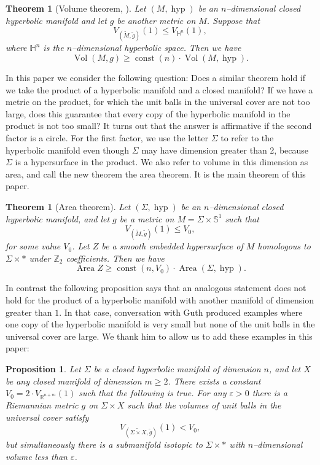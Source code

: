 \documentclass[12pt]{amsart}
\makeatletter
\newtheorem*{rep@theorem}{{Lemma} \ref##}
\newtheorem{thm}[dfn]{Theorem}
    {\newenvironment{rep{thm}}[1]{ } \begin{rep@theorem}} \end{rep@theorem}}
\newtheorem{prop}[dfn]{Proposition}
	{\newenvironment{rep{prop}}[1]{ } \begin{rep@theorem}} \end{rep@theorem}}
\numberwithin{equation}{section}
\makeatother
\begin{document}
\begin{thm}[{Volume theorem, \cite{Guth11}}]\label{thm-vol}
 Let $(M, \operatorname{hyp})$ be an $n$--dimensional closed hyperbolic manifold and let $g$ be another metric on $M$. Suppose that
\[V_{(\widetilde{M}, \widetilde{g})}(1) \leq V_{\mathbb{H}^n}(1),\]
where $\mathbb{H}^n$ is the $n$--dimensional hyperbolic
 space.  Then we have
\[\operatorname{Vol}(M, g) \geq \operatorname{const}(n) \cdot \operatorname{Vol}(M, \operatorname{hyp}).\]
\end{thm}

In this paper we consider the following question: Does a similar theorem
hold if we take the product of a hyperbolic manifold and a closed
manifold? If we have a metric on the product, for
which the unit balls in the universal cover are not too large, does this guarantee that every
copy of the hyperbolic manifold in the product is not too small? It turns out that the answer is affirmative if the second factor is a circle.  For the first factor, we use the letter $\Sigma$ to refer
to the hyperbolic manifold even though $\Sigma$ may have dimension greater than 2, because $\Sigma$ is a hypersurface in the product.  We also refer to volume in this dimension as area, and call
the new theorem the area theorem.  It is the main theorem of this paper.

\begin{thm}[Area theorem]\label{thm-homology}
  Let $(\Sigma, \operatorname{hyp})$ be an $n$--dimensional closed hyperbolic manifold, and let $g$ be a metric on $M = \Sigma \times \mathbb{S}^1$ such that 
\[V_{(\widetilde{M}, \widetilde{g})}(1) \leq V_0,\]
for some value $V_0$.  Let $Z$ be a smooth embedded hypersurface of $M$ homologous to $\Sigma \times \ast$ under $\mathbb{Z}_2$ coefficients.  Then we have
\[\operatorname{Area} Z \geq \operatorname{const}(n, V_0) \cdot \operatorname{Area} (\Sigma, \operatorname{hyp}).\]
\end{thm}

In contrast the following proposition says that an analogous statement does not hold for the product of a hyperbolic manifold with another manifold of dimension greater than $1$.  In that case, conversation with Guth produced examples where one copy of the hyperbolic manifold is very small but none of the unit balls in the universal cover are large. We thank him to allow us to add these examples in this paper:

\begin{prop}\label{prop:codim2}
Let $\Sigma$ be a closed hyperbolic manifold of dimension $n$, and let $X$ be any closed manifold of dimension $m \geq 2$.  There exists a constant $V_0 = 2\cdot V_{\mathbb{R}^{n+m}}(1)$ such that the following is true.  For any $\varepsilon > 0$ there is a Riemannian metric $g$ on $\Sigma \times X$ such that the volumes of unit balls in the universal cover satisfy
\[V_{(\widetilde{\Sigma \times X}, \widetilde{g})}(1) < V_0,\]
but simultaneously there is a submanifold isotopic to $\Sigma \times \ast$ with $n$--dimensional volume less than $\varepsilon$.
\end{prop}
\end{document}
